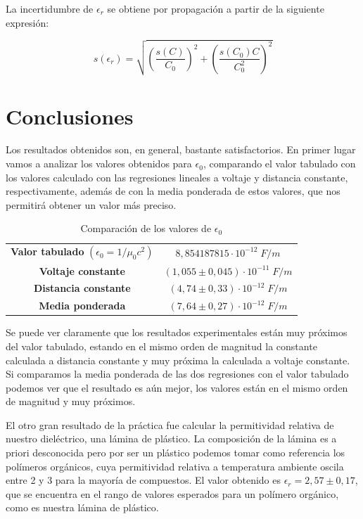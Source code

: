 \documentclass[a4paper,12pt,titlepage]{article}
\begin{document}
La incertidumbre de $\epsilon_r$ se obtiene por propagación a partir de la siguiente expresión:

\begin{equation}
    s(\epsilon_r) = \sqrt{\left( \frac{s(C)}{C_0}\right)^2 + \left(\frac{s(C_0)C}{C_0^2}\right)^2}
\end{equation}

\section{Conclusiones}

Los resultados obtenidos son, en general, bastante satisfactorios. En primer lugar vamos a analizar los valores obtenidos para $\epsilon_0$, comparando el valor tabulado con los valores calculado con las regresiones lineales a voltaje y distancia constante, respectivamente, además de con la media ponderada de estos valores, que nos permitirá obtener un valor más preciso.

\begin{table}[h!]
\centering
\begin{tabular}{cc}
\textbf{Valor tabulado} $(\epsilon_0=1/\mu_0c^2)$  & $8,854187815 \cdot 10^{-12}\; F/m$ \\ 
\textbf{Voltaje constante}   & $(1,055 \pm 0,045)\cdot 10^{-11} \; F/m$ \\ 
\textbf{Distancia constante} & $(4,74 \pm 0,33)\cdot 10^{-12} \; F/m$ \\
\textbf{Media ponderada} & $(7,64 \pm 0,27)\cdot 10^{-12} \; F/m$
\end{tabular}
\caption{Comparación de los valores de $\epsilon_0$}
\label{tab:my-table}
\end{table}

Se puede ver claramente que los resultados experimentales están muy próximos del valor tabulado, estando en el mismo orden de magnitud la constante calculada a distancia constante y muy próxima la calculada a voltaje constante. Si comparamos la media ponderada de las dos regresiones con el valor tabulado podemos ver que el resultado es aún mejor, los valores están en el mismo orden de magnitud y muy próximos.

El otro gran resultado de la práctica fue calcular la permitividad relativa de nuestro dieléctrico, una lámina de plástico. La composición de la lámina es a priori desconocida pero por ser un plástico podemos tomar como referencia los polímeros orgánicos, cuya permitividad relativa a temperatura ambiente oscila entre 2 y 3 para la mayoría de compuestos. El valor obtenido es $\epsilon_r=2,57 \pm 0,17$, que se encuentra en el rango de valores esperados para un polímero orgánico, como es nuestra lámina de plástico.
\end{document}
